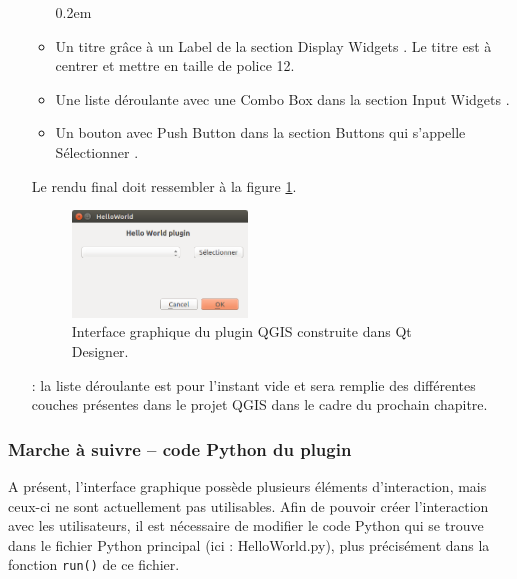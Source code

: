 \documentclass[11pt]{article}
\begin{document}
\begin{enumerate}
\begin{itemize}\itemsep0.2em
\renewcommand\labelitemi{\---}
\item Un titre grâce à un \og{}Label\fg{} de la section \og Display Widgets \fg{}. Le titre est à centrer et mettre en taille de police 12.
\item Une liste déroulante avec une \og Combo Box \fg{}  dans la section \og Input Widgets \fg{}.
\item Un bouton avec \og Push Button \fg{} dans la section \og Buttons \fg{} qui s'appelle \og Sélectionner \fg{}.
\end{itemize}

Le rendu final doit ressembler à la figure \ref{ig}.


\vspace*{-0.4em}
\begin{figure}[H]
    \centering
    \includegraphics[width=0.44\textwidth]{plugin_layout.png}
    \vspace*{-0.8em}
    \caption[Interface graphique du plugin]{Interface graphique du plugin QGIS construite dans Qt Designer.}
    \label{ig}
\end{figure}



\underline{}: la liste déroulante est pour l'instant vide et sera remplie des différentes couches présentes dans le projet QGIS dans le cadre du prochain chapitre. 


\end{enumerate}




\subsubsection{Marche à suivre \--- code Python du plugin}
A présent, l'interface graphique possède plusieurs éléments d'interaction, mais ceux-ci ne sont actuellement pas utilisables. Afin de pouvoir créer l'interaction avec les utilisateurs, il est nécessaire de modifier le code Python qui se trouve dans le fichier Python principal (ici : \og{}HelloWorld.py\fg{}), plus précisément dans la fonction \texttt{run()} de ce fichier.
\end{document}
